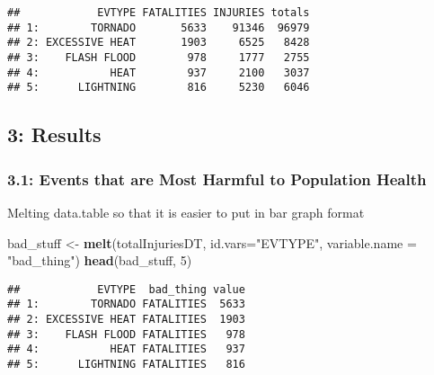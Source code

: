 \documentclass[]{article}
\newenvironment{Shaded}{\begin{snugshade}}{\end{snugshade}}
\newcommand{\KeywordTok}[1]{\textcolor[rgb]{0.13,0.29,0.53}{\textbf{#1}}}
\newcommand{\DataTypeTok}[1]{\textcolor[rgb]{0.13,0.29,0.53}{#1}}
\newcommand{\DecValTok}[1]{\textcolor[rgb]{0.00,0.00,0.81}{#1}}
\newcommand{\StringTok}[1]{\textcolor[rgb]{0.31,0.60,0.02}{#1}}
\newcommand{\NormalTok}[1]{#1}
\begin{document}
\begin{verbatim}
##            EVTYPE FATALITIES INJURIES totals
## 1:        TORNADO       5633    91346  96979
## 2: EXCESSIVE HEAT       1903     6525   8428
## 3:    FLASH FLOOD        978     1777   2755
## 4:           HEAT        937     2100   3037
## 5:      LIGHTNING        816     5230   6046
\end{verbatim}

\subsection{3: Results}\label{results}

\subsubsection{3.1: Events that are Most Harmful to Population
Health}\label{events-that-are-most-harmful-to-population-health}

Melting data.table so that it is easier to put in bar graph format

\begin{Shaded}
\begin{Highlighting}[]
\NormalTok{bad_stuff <-}\StringTok{ }\KeywordTok{melt}\NormalTok{(totalInjuriesDT, }\DataTypeTok{id.vars=}\StringTok{"EVTYPE"}\NormalTok{, }\DataTypeTok{variable.name =} \StringTok{"bad_thing"}\NormalTok{)}
\KeywordTok{head}\NormalTok{(bad_stuff, }\DecValTok{5}\NormalTok{)}
\end{Highlighting}
\end{Shaded}

\begin{verbatim}
##            EVTYPE  bad_thing value
## 1:        TORNADO FATALITIES  5633
## 2: EXCESSIVE HEAT FATALITIES  1903
## 3:    FLASH FLOOD FATALITIES   978
## 4:           HEAT FATALITIES   937
## 5:      LIGHTNING FATALITIES   816
\end{verbatim}
\end{document}
